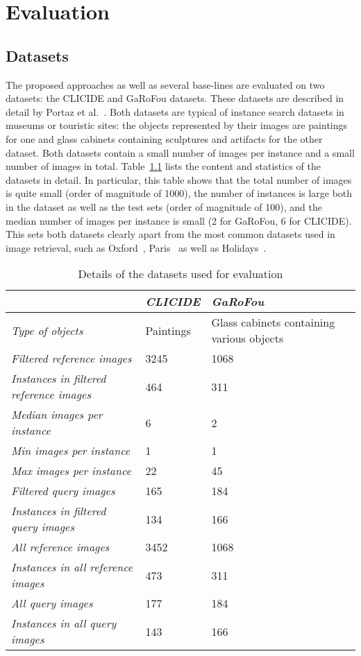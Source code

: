
\chapter{Evaluation}\label{sec:evaluation}
\section{Datasets}\label{sec:datasets}
The proposed approaches as well as several base-lines are evaluated
on two datasets: the CLICIDE and GaRoFou datasets. These datasets are
described in detail by Portaz et al.~\cite{portaz_construction_2017}.
Both datasets are typical of instance search datasets
in museums or touristic sites: the objects represented by their images
are paintings for one and glass cabinets containing sculptures and artifacts
for the other dataset. Both datasets contain a small number of images
per instance and a small number of images in total.
Table~\ref{tab:datasets} lists the content and statistics of the datasets
in detail. In particular, this table shows that the total number of images
is quite small (order of magnitude of 1000), the number of instances
is large both in the dataset as well as the test sets (order of magnitude
of 100), and the median number of images per instance is small
(2 for GaRoFou, 6 for CLICIDE). This sets both datasets clearly apart
from the most common datasets used in image retrieval, such as
Oxford~\cite{philbin_object_2007}, Paris~\cite{philbin_lost_2008}
as well as Holidays~\cite{jegou_hamming_2008}.

\begin{table}
\begin{tabular}{|l|l|l|}
\hline & \emph{CLICIDE} & \emph{GaRoFou}\\
\hline \emph{Type of objects} & Paintings & Glass cabinets
containing various objects\\
\hline \emph{Filtered reference images} & 3245 & 1068\\
\hline \emph{Instances in filtered reference images} & 464 & 311\\
\hline \emph{Median images per instance} & 6 & 2\\
\hline \emph{Min images per instance} & 1 & 1\\
\hline \emph{Max images per instance} & 22 & 45\\
\hline \emph{Filtered query images} & 165 & 184\\
\hline \emph{Instances in filtered query images} & 134 & 166\\
\hline \emph{All reference images} & 3452 & 1068\\
\hline \emph{Instances in all reference images} & 473 & 311\\
\hline \emph{All query images} & 177 & 184\\
\hline \emph{Instances in all query images} & 143 & 166\\
\hline
\end{tabular}
\caption{Details of the datasets used for evaluation\label{tab:datasets}}
\end{table}

